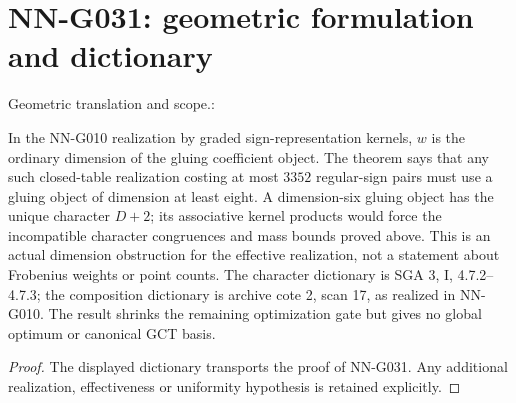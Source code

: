 \section{NN-G031: geometric formulation and dictionary}
\begin{geometricstatement}[NN-G031]
Geometric translation and scope.:

In the NN-G010 realization by graded sign-representation
kernels, $w$ is the ordinary dimension of the gluing
coefficient object. The theorem says that any such
closed-table realization costing at most $3352$
regular-sign pairs must use a gluing object of dimension
at least eight. A dimension-six gluing object has the
unique character $D+2$; its associative kernel products
would force the incompatible character congruences and
mass bounds proved above. This is an actual dimension
obstruction for the effective realization, not a statement
about Frobenius weights or point counts. The character
dictionary is SGA 3, I, 4.7.2--4.7.3; the composition
dictionary is archive cote 2, scan 17, as realized in
NN-G010. The result shrinks the remaining optimization
gate but gives no global optimum or canonical GCT basis.



\end{geometricstatement}
\begin{proof} The displayed dictionary transports the proof of NN-G031. Any additional realization, effectiveness or uniformity hypothesis is retained explicitly.\end{proof}


